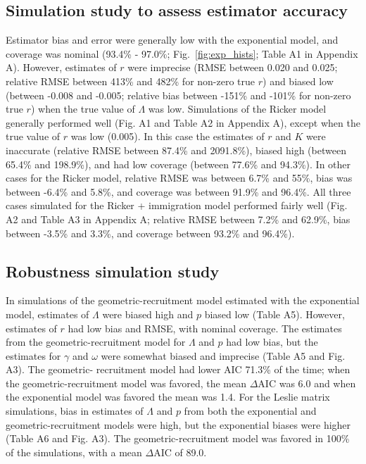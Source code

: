 \documentclass[12pt,english]{article}
\begin{document}
\begin{spacing}{1.9}
\begin{flushleft}
\subsection*{Simulation study to assess estimator accuracy}

Estimator bias and error were generally low with the exponential model, and 
coverage was nominal (93.4\% - 97.0\%; Fig.~\ref{fig:exp_hists}; Table A1 in Appendix A). 
However, estimates of $r$ were 
imprecise (RMSE between 0.020 and 0.025; relative RMSE between 413\% and 
482\% for non-zero true $r$) and biased low (between -0.008 and -0.005; relative bias between
-151\% and -101\% for non-zero true $r$) when the true value of
$\Lambda$ was low. 
Simulations of the Ricker model 
generally performed well (Fig. A1 and Table A2 in Appendix A), except when the true value of $r$ was low (0.005). In this case the 
estimates of $r$ and $K$ were inaccurate (relative RMSE between 87.4\% and 2091.8\%),
biased high (between 65.4\% and 198.9\%), and had low coverage (between 77.6\% and 94.3\%).
In other cases for the Ricker model, relative RMSE was between 6.7\%
and 55\%, bias was between -6.4\% and 5.8\%, and coverage was between
91.9\% and 96.4\%.  All three cases simulated for the Ricker + immigration model 
performed fairly well (Fig. A2 and Table A3 in Appendix A; relative RMSE between 7.2\% 
and 62.9\%, bias between -3.5\% and 3.3\%, and coverage between
93.2\% and 96.4\%).  
  
\subsection*{Robustness simulation study}
In simulations of the geometric-recruitment model estimated with the exponential model,
estimates of $\Lambda$ were biased high 
and $p$ biased low (Table A5). 
However, estimates of $r$ had low bias and RMSE, with nominal coverage. 
The estimates from the geometric-recruitment model for $\Lambda$ and $p$ had low bias, but the estimates
for $\gamma$ and $\omega$ were somewhat biased and imprecise (Table A5 and Fig. A3).
The geometric- recruitment model had lower
AIC 71.3\% of the time; when the geometric-recruitment model was favored, the
mean $\Delta$AIC was 6.0 and when the exponential model was favored
the mean was 1.4.  
For the Leslie matrix simulations, bias in estimates of $\Lambda$ and $p$ from both the exponential and geometric-recruitment models
were high, but the exponential biases were higher (Table A6 and Fig. A3).  
The geometric-recruitment model was favored in 100\% of the simulations, 
with a mean $\Delta$AIC of 89.0.  


\end{flushleft}
\end{spacing}
\end{document}
